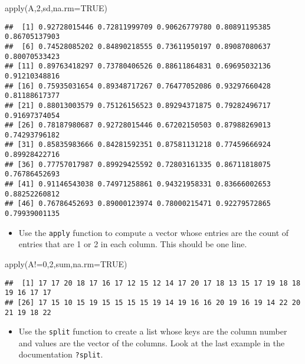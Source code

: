 \documentclass[
]{article}
\newenvironment{Shaded}{\begin{snugshade}}{\end{snugshade}}
\newcommand{\AttributeTok}[1]{\textcolor[rgb]{0.77,0.63,0.00}{#1}}
\newcommand{\ConstantTok}[1]{\textcolor[rgb]{0.00,0.00,0.00}{#1}}
\newcommand{\DecValTok}[1]{\textcolor[rgb]{0.00,0.00,0.81}{#1}}
\newcommand{\FunctionTok}[1]{\textcolor[rgb]{0.00,0.00,0.00}{#1}}
\newcommand{\NormalTok}[1]{#1}
\newcommand{\SpecialCharTok}[1]{\textcolor[rgb]{0.00,0.00,0.00}{#1}}
\providecommand{\tightlist}{%
  \setlength{\itemsep}{0pt}\setlength{\parskip}{0pt}}
\begin{document}
\begin{Shaded}
\begin{Highlighting}[]
\FunctionTok{apply}\NormalTok{(A,}\DecValTok{2}\NormalTok{,sd,}\AttributeTok{na.rm=}\ConstantTok{TRUE}\NormalTok{)}
\end{Highlighting}
\end{Shaded}

\begin{verbatim}
##  [1] 0.92728015446 0.72811999709 0.90626779780 0.80891195385 0.86705137903
##  [6] 0.74528085202 0.84890218555 0.73611950197 0.89087080637 0.80070533423
## [11] 0.89763418297 0.73780406526 0.88611864831 0.69695032136 0.91210348816
## [16] 0.75935031654 0.89348717267 0.76477052086 0.93297660428 0.81188617377
## [21] 0.88013003579 0.75126156523 0.89294371875 0.79282496717 0.91697374054
## [26] 0.78187980687 0.92728015446 0.67202150503 0.87988269013 0.74293796182
## [31] 0.85835983666 0.84281592351 0.87581131218 0.77459666924 0.89928422716
## [36] 0.77757017987 0.89929425592 0.72803161335 0.86711818075 0.76786452693
## [41] 0.91146543038 0.74971258861 0.94321958331 0.83666002653 0.88252260812
## [46] 0.76786452693 0.89000123974 0.78000215471 0.92279572865 0.79939001135
\end{verbatim}

\begin{itemize}
\tightlist
\item
  Use the \texttt{apply} function to compute a vector whose entries are
  the count of entries that are 1 or 2 in each column. This should be
  one line.
\end{itemize}

\begin{Shaded}
\begin{Highlighting}[]
\FunctionTok{apply}\NormalTok{(A}\SpecialCharTok{!=}\DecValTok{0}\NormalTok{,}\DecValTok{2}\NormalTok{,sum,}\AttributeTok{na.rm=}\ConstantTok{TRUE}\NormalTok{)}
\end{Highlighting}
\end{Shaded}

\begin{verbatim}
##  [1] 17 17 20 18 17 16 17 12 15 12 14 17 20 17 18 13 15 17 19 18 18 19 16 17 17
## [26] 17 15 10 15 19 15 15 15 15 19 14 19 16 16 20 19 16 19 14 22 20 21 19 18 22
\end{verbatim}

\begin{itemize}
\tightlist
\item
  Use the \texttt{split} function to create a list whose keys are the
  column number and values are the vector of the columns. Look at the
  last example in the documentation \texttt{?split}.
\end{itemize}
\end{document}
